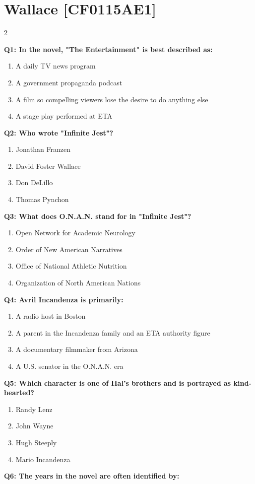 \documentclass[10pt]{article}
\begin{document}
\section*{Wallace \footnotesize [CF0115AE1]}
\begin{multicols}{2}

\textbf{Q1: In the novel, "The Entertainment" is best described as:}

\begin{enumerate}[label=\arabic*.]
\item A daily TV news program
\item A government propaganda podcast
\item A film so compelling viewers lose the desire to do anything else
\item A stage play performed at ETA
\end{enumerate}
\textbf{Q2: Who wrote "Infinite Jest"?}

\begin{enumerate}[label=\arabic*.]
\item Jonathan Franzen
\item David Foster Wallace
\item Don DeLillo
\item Thomas Pynchon
\end{enumerate}
\textbf{Q3: What does O.N.A.N. stand for in "Infinite Jest"?}

\begin{enumerate}[label=\arabic*.]
\item Open Network for Academic Neurology
\item Order of New American Narratives
\item Office of National Athletic Nutrition
\item Organization of North American Nations
\end{enumerate}
\textbf{Q4: Avril Incandenza is primarily:}

\begin{enumerate}[label=\arabic*.]
\item A radio host in Boston
\item A parent in the Incandenza family and an ETA authority figure
\item A documentary filmmaker from Arizona
\item A U.S. senator in the O.N.A.N. era
\end{enumerate}
\textbf{Q5: Which character is one of Hal's brothers and is portrayed as kind-hearted?}

\begin{enumerate}[label=\arabic*.]
\item Randy Lenz
\item John Wayne
\item Hugh Steeply
\item Mario Incandenza
\end{enumerate}
\textbf{Q6: The years in the novel are often identified by:}


\end{multicols}
\end{document}
